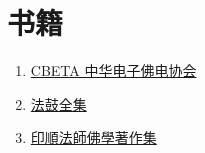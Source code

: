 \chapter{书籍}
\begin{enumerate}
  \item \href{http://www.cbeta.org/download/cbreader.htm}{CBETA 中华电子佛电协会}
  \item \href{http://ddc.shengyen.org/mobile/}{法鼓全集}
  \item \href{http://yinshun-edu.org.tw/Master_yinshun/books}{印順法師佛學著作集}
\end{enumerate}
